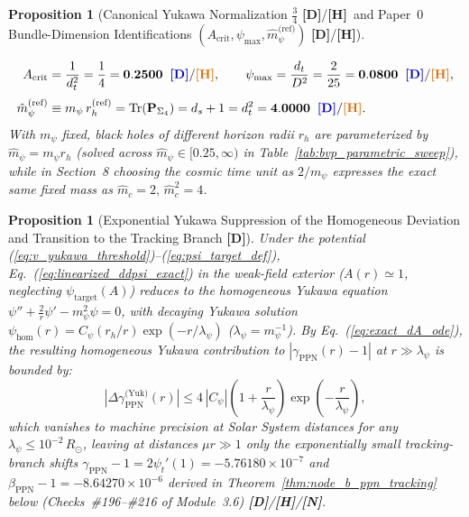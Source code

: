 \documentclass[11pt,a4paper]{article}
\newcommand{\catD}{\textbf{\textcolor{blue!75!black}{[D]}}}
\newcommand{\catH}{\textbf{\textcolor{orange!85!black}{[H]}}}
\newcommand{\catN}{\textbf{\textcolor{teal!75!black}{[N]}}}
\newtheorem{proposition}[theorem]{Proposition}
\theoremstyle{definition}
\theoremstyle{remark}
\begin{document}
\begin{proposition}[Canonical Yukawa Normalization $\frac{3}{4}$ \catD/\catH\ and Paper~0 Bundle-Dimension Identifications $(A_{\text{crit}}, \psi_{\max}, \hat{m}_{\psi}^{\text{(ref)}})$ \catD/\catH]
\begin{enumerate}
  \begin{align}
    A_{\text{crit}} &= \frac{1}{d_t^2} = \frac{1}{4} = \mathbf{0.2500} \;\;\catD/\catH, \qquad \psi_{\max} = \frac{d_t}{D^2} = \frac{2}{25} = \mathbf{0.0800} \;\;\catD/\catH, \nonumber \\[3pt]
    \hat{m}_{\psi}^{\text{(ref)}} &\equiv m_{\psi}\,r_h^{\text{(ref)}} = \text{Tr}(\mathbf{P}_{\Sigma_4}) = d_s + 1 = d_t^2 = \mathbf{4.0000} \;\;\catD/\catH.
    \label{eq:deductive_mpsi_4}
  \end{align}
  With $m_{\psi}$ fixed, black holes of different horizon radii $r_h$ are parameterized by $\hat{m}_{\psi} = m_{\psi}r_h$ (solved across $\hat{m}_{\psi} \in [0.25, \infty)$ in Table~\ref{tab:bvp_parametric_sweep}), while in Section~8 choosing the cosmic time unit as $2/m_{\psi}$ expresses the exact same fixed mass as $\hat{m}_c = 2, \, \hat{m}_c^2 = 4$.
\end{enumerate}
\end{proposition}

\begin{proposition}[Exponential Yukawa Suppression of the Homogeneous Deviation and Transition to the Tracking Branch \catD]
\label{prop:yukawa_cassini_pass}
Under the potential (\ref{eq:v_yukawa_threshold})--(\ref{eq:psi_target_def}), Eq.~(\ref{eq:linearized_ddpsi_exact}) in the weak-field exterior ($A(r) \simeq 1$, neglecting $\psi_{\text{target}}(A)$) reduces to the homogeneous Yukawa equation $\psi'' + \frac{2}{r}\psi' - m_{\psi}^2\psi = 0$, with decaying Yukawa solution $\psi_{\text{hom}}(r) = C_{\psi}(r_h/r)\exp(-r/\lambda_{\psi})$ ($\lambda_{\psi} = m_{\psi}^{-1}$). By Eq.~(\ref{eq:exact_dA_ode}), the resulting homogeneous Yukawa contribution to $|\gamma_{\text{PPN}}(r) - 1|$ at $r \gg \lambda_{\psi}$ is bounded by:
\begin{equation}
  \left|\Delta\gamma_{\text{PPN}}^{\text{(Yuk)}}(r)\right| \le 4\,|C_{\psi}|\left(1 + \frac{r}{\lambda_{\psi}}\right)\exp\!\left(-\frac{r}{\lambda_{\psi}}\right),
  \label{eq:ppn_yukawa_bound}
\end{equation}
which vanishes to machine precision at Solar System distances for any $\lambda_{\psi} \le 10^{-2}\,R_{\odot}$, leaving at distances $\mu r \gg 1$ only the exponentially small tracking-branch shifts $\gamma_{\text{PPN}} - 1 = 2\psi_t'(1) = -5.76180 \times 10^{-7}$ and $\beta_{\text{PPN}} - 1 = -8.64270 \times 10^{-6}$ derived in Theorem~\ref{thm:node_b_ppn_tracking} below (Checks~\#196--\#216 of Module~3.6) \catD/\catH/\catN.
\end{proposition}
\end{document}
